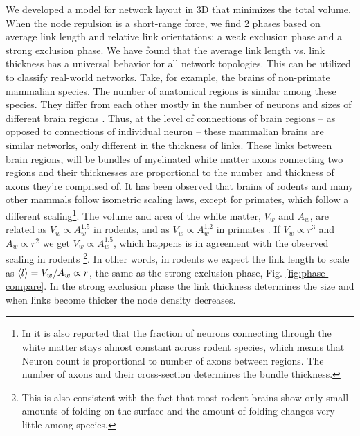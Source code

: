 \documentclass[nofootinbib,preprint,floatfix,endfloats]{revtex4} %
\begin{document}
We developed a model for network layout in 3D that minimizes the total volume. 
When the node repulsion is a short-range force, we find 2 phases based on average link length and relative link orientations: a weak exclusion phase and a strong exclusion phase. 
We have found that the average link length vs. link thickness has a universal behavior for all network topologies. 
This can be utilized to classify real-world networks. 
Take, for example, the brains of non-primate mammalian species. 
The number of anatomical regions is similar among these species. 
They differ from each other mostly in the number of neurons and sizes of different brain regions \cite{azevedo2009equal, herculano2012remarkable, herculano2014brain}. 
Thus, at the level of connections of brain regions -- as opposed to connections of individual neuron -- these mammalian brains are similar networks, only different in the thickness of links. 
These links 
between brain regions, will be bundles of myelinated white matter axons connecting two regions and their thicknesses are proportional to the number and thickness of axons they're comprised of. 
It has been observed that brains of rodents \cite{herculano2012remarkable} and many other mammals \cite{herculano2014brain} follow isometric scaling laws, except for primates, which follow a different scaling\footnote{In \cite{herculano2012remarkable} it is also reported that the fraction of neurons connecting through the white matter stays almost constant across rodent species, which means that Neuron count is proportional to number of axons between regions. The number of axons and their cross-section determines the bundle thickness.}. 
The volume and area of the white matter, $V_w$ and $A_w$, are related as $V_w\propto A_w^{1.5}$ in rodents, and as $V_w \propto A_w^{1.2}$ in primates  \cite{herculano2012remarkable}. 
If $V_w \propto r^3$ and $A_w \propto r^2$ we get $V_w \propto A_w^{1.5}$, which happens is in agreement with the observed scaling in rodents
\footnote{This is also consistent with the fact that most rodent brains show only small amounts of folding on the surface and the amount of folding changes very little among species.}. In other words, in rodents we expect the link length to scale as $ \left<l\right> = V_w/A_w \propto r $, the same as the strong exclusion phase, Fig. \ref{fig:phase-compare}. 
In the strong exclusion phase the link thickness determines the size and when links become thicker the node density decreases. 
\end{document}
